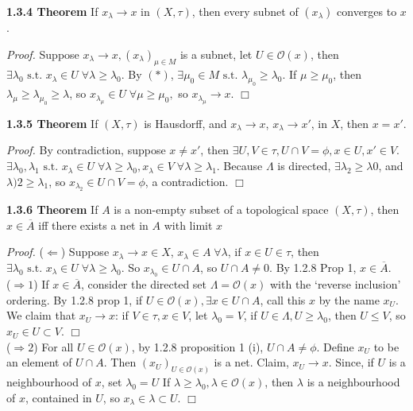 \documentclass[12pt]{article}
\newcommand{\st}[0]{ \textrm{ s.t. } }
\newcommand{\rimply}[0] { \Rightarrow }
\newcommand{\limply}[0] { \Leftarrow }
\newcommand{\rarw}[0] { \rightarrow }
\newcommand{\curlyO}[0] { \mathcal{O} }
\begin{document}
\begin{flushleft} {\bf 1.3.4 Theorem} If $x_\lambda \rarw x$ in $(X, \tau)$, then every subnet of $(x_\lambda)$ converges to $x$.
\end{flushleft}

\begin{flushleft} \emph{Proof. } Suppose $x_\lambda \rarw x, (x_\lambda)_{\mu \in M}$ is a subnet, let $U \in \curlyO(x)$, then $\exists \lambda_0 \st x_\lambda \in U \; \forall \lambda \ge \lambda_0$. By $(*)$, $\exists \mu_0 \in M \st \lambda_{\mu_0} \ge \lambda_0$. If $\mu \ge \mu_0$, then $\lambda_\mu \ge \lambda_{\mu_0} \ge \lambda$, so $x_{\lambda_\mu} \in U \; \forall \mu \ge \mu_0,$ so $x_{\lambda_\mu} \rarw x$. 
$\Box$
\end{flushleft}


\begin{flushleft} {\bf 1.3.5 Theorem} If $(X, \tau)$ is Hausdorff, and $x_\lambda \rarw x$, $x_\lambda \rarw x'$, in $X$, then $x = x'$.
\end{flushleft}

\begin{flushleft} \emph{Proof. } By contradiction, suppose $x \not = x'$, then $\exists U, V \in \tau, U \cap V = \phi, x \in U, x' \in V$. $\exists \lambda_0, \lambda_1 \st x_\lambda \in U \; \forall \lambda \ge \lambda_0, x_\lambda \in V \; \forall \lambda \ge \lambda_1$. Because $\Lambda$ is directed, $\exists \lambda_2 \ge \lambda 0$, and $\lambda)2 \ge \lambda_1$, so $x_{\lambda_2} \in U \cap V = \phi$, a contradiction. $\Box$
\end{flushleft}

\begin{flushleft} {\bf 1.3.6 Theorem} If $A$ is a non-empty subset of a topological space $(X, \tau)$, then $x \in \overline{A}$ iff there exists a net in $A$ with limit $x$
\end{flushleft}

\begin{flushleft} \emph{Proof. } ($\limply$) Suppose $x_\lambda \rarw x \in X$, $x_\lambda \in A \; \forall \lambda$, if $x \in U \in \tau$, then $\exists \lambda_0 \st x_\lambda \in U \; \forall \lambda \ge \lambda_0$. So $x_{\lambda_0} \in U \cap A$, so $U \cap A \not = 0$. By 1.2.8 Prop 1, $x \in \overline{A}$.  \\
($\rimply 1$) If $x \in \overline{A}$, consider the directed set $\Lambda = \curlyO(x)$ with the `reverse inclusion' ordering. 
By 1.2.8 prop 1, if $U \in \curlyO(x), \exists x \in U \cap A$, call this $x$ by the name $x_U$. 
We claim that $x_U \rarw x$: if $V \in \tau, x \in V$,
 let $\lambda_0 = V$, if $U \in \Lambda, U  \ge \lambda_0$,
 then $U \le V$, so $x_U \in U \subset V$. $\Box$ \\
($\rimply 2$) For all $U \in \curlyO(x)$, by 1.2.8 proposition 1 (i), $U \cap A \not = \phi$. Define $x_U$ to be an element of $U \cap A$. Then $(x_U) _ { U \in \curlyO(x)}$ is a net. Claim, $x_U \rarw x$. Since, if $U$ is a neighbourhood of $x$, set $\lambda_0 = U$ If $\lambda \ge \lambda_0, \lambda \in \curlyO(x)$, then $\lambda$ is a neighbourhood of $x$, contained in $U$, so $x_\lambda \in \lambda \subset U$. $\Box$
\end{flushleft}
\end{document}
